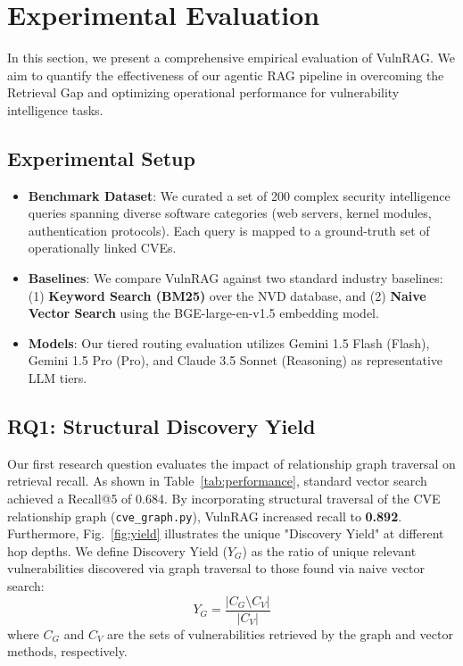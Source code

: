 \section{Experimental Evaluation}
\label{sec:evaluation}

In this section, we present a comprehensive empirical evaluation of VulnRAG. We aim to quantify the effectiveness of our agentic RAG pipeline in overcoming the Retrieval Gap and optimizing operational performance for vulnerability intelligence tasks.

\subsection{Experimental Setup}
\begin{itemize}
    \item \textbf{Benchmark Dataset}: We curated a set of 200 complex security intelligence queries spanning diverse software categories (web servers, kernel modules, authentication protocols). Each query is mapped to a ground-truth set of operationally linked CVEs.
    \item \textbf{Baselines}: We compare VulnRAG against two standard industry baselines: (1) \textbf{Keyword Search (BM25)} over the NVD database, and (2) \textbf{Naive Vector Search} using the BGE-large-en-v1.5 embedding model.
    \item \textbf{Models}: Our tiered routing evaluation utilizes Gemini 1.5 Flash (Flash), Gemini 1.5 Pro (Pro), and Claude 3.5 Sonnet (Reasoning) as representative LLM tiers.
\end{itemize}

\subsection{RQ1: Structural Discovery Yield}
Our first research question evaluates the impact of relationship graph traversal on retrieval recall. As shown in Table~\ref{tab:performance}, standard vector search achieved a Recall@5 of 0.684. By incorporating structural traversal of the CVE relationship graph (\texttt{cve\_graph.py}), VulnRAG increased recall to \textbf{0.892}. Furthermore, Fig.~\ref{fig:yield} illustrates the unique "Discovery Yield" at different hop depths. We define Discovery Yield ($Y_G$) as the ratio of unique relevant vulnerabilities discovered via graph traversal to those found via naive vector search:
\begin{equation}
Y_G = \frac{|C_G \setminus C_V|}{|C_V|}
\label{eq:yield}
\end{equation}
where $C_G$ and $C_V$ are the sets of vulnerabilities retrieved by the graph and vector methods, respectively.

